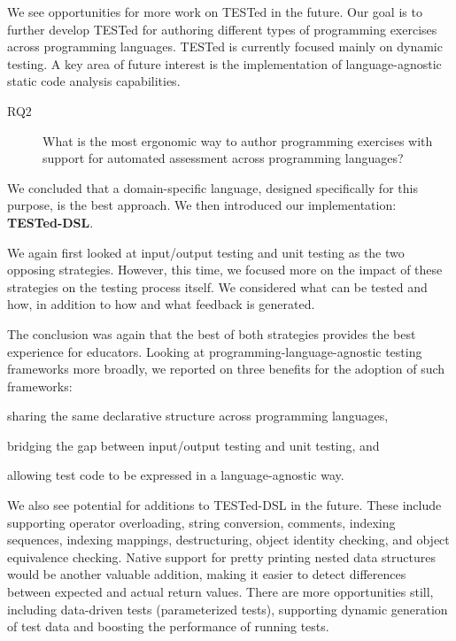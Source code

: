 \documentclass[main]{subfiles}
\begin{document}
We see opportunities for more work on TESTed in the future.
Our goal is to further develop TESTed for authoring different types of programming exercises across programming languages.
TESTed is currently focused mainly on dynamic testing.
A key area of future interest is the implementation of language-agnostic static code analysis capabilities.

\begin{description}
    \item[RQ2] What is the most ergonomic way to author programming exercises with support for automated assessment across programming languages?
\end{description}

We concluded that a domain-specific language, designed specifically for this purpose, is the best approach.
We then introduced our implementation: \textbf{TESTed-DSL}\@.

We again first looked at input/output testing and unit testing as the two opposing strategies.
However, this time, we focused more on the impact of these strategies on the testing process itself.
We considered what can be tested and how, in addition to how and what feedback is generated.

The conclusion was again that the best of both strategies provides the best experience for educators.
Looking at programming-language-agnostic testing frameworks more broadly, we reported on three benefits for the adoption of such frameworks: \begin{enumerate*}[label=\emph{\roman*})] \item sharing the same declarative structure across programming languages, \item bridging the gap between input/output testing and unit testing, and \item allowing test code to be expressed in a language-agnostic way.\end{enumerate*}

We also see potential for additions to TESTed-DSL in the future.
These include supporting operator overloading, string conversion, comments, indexing sequences, indexing mappings, destructuring, object identity checking, and object equivalence checking.
Native support for pretty printing nested data structures would be another valuable addition, making it easier to detect differences between expected and actual return values.
There are more opportunities still, including data-driven tests (parameterized tests), supporting dynamic generation of test data and boosting the performance of running tests.
\end{document}
